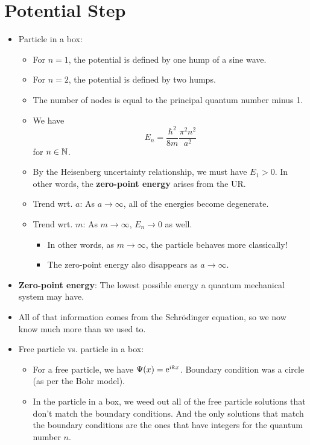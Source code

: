 \documentclass[../notes.tex]{subfiles}
\begin{document}
\section{Potential Step}
\begin{itemize}
    \item {}Particle in a box:
    \begin{itemize}
        \item For $n=1$, the potential is defined by one hump of a sine wave.
        \item For $n=2$, the potential is defined by two humps.
        \item The number of nodes is equal to the principal quantum number minus 1.
        \item We have
        \begin{equation*}
            E_n = \frac{\hbar^2}{8m}\frac{\pi^2n^2}{a^2}
        \end{equation*}
        for $n\in\N$.
        \item By the Heisenberg uncertainty relationship, we must have $E_1>0$. In other words, the \textbf{zero-point energy} arises from the UR.
        \item Trend wrt. $a$: As $a\to\infty$, all of the energies become degenerate.
        \item Trend wrt. $m$: As $m\to\infty$, $E_n\to 0$ as well.
        \begin{itemize}
            \item In other words, as $m\to\infty$, the particle behaves more classically!
            \item The zero-point energy also disappears as $a\to\infty$.
        \end{itemize}
    \end{itemize}
    \item \textbf{Zero-point energy}: The lowest possible energy a quantum mechanical system may have.
    \item All of that information comes from the Schr\"{o}dinger equation, so we now know much more than we used to.
    \item Free particle vs. particle in a box:
    \begin{itemize}
        \item For a free particle, we have $\Psi(x)=\e[ikx]$. Boundary condition was a circle (as per the Bohr model).
        \item In the particle in a box, we weed out all of the free particle solutions that don't match the boundary conditions. And the only solutions that match the boundary conditions are the ones that have integers for the quantum number $n$.

\end{itemize}
\end{itemize}
\end{document}
